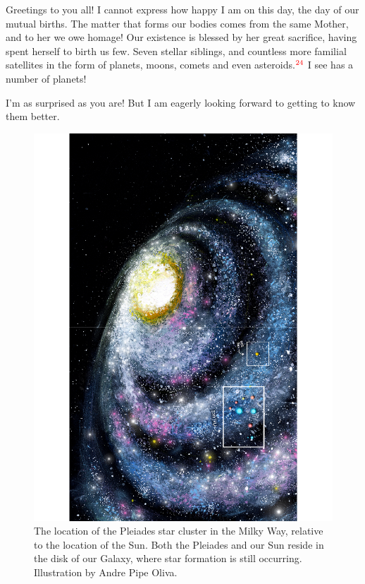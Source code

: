\documentclass[main.tex]{subfiles}
\begin{document}

\par \Maia Greetings to you all!  I cannot express how happy I am on this day, the day of our mutual births.  The matter that forms our bodies comes from the same Mother, and to her we owe homage!  Our existence is blessed by her great sacrifice, having spent herself to birth us few.  Seven stellar siblings, and countless more familial satellites in the form of planets, moons, comets and even asteroids.$^{\textcolor{red}{24}}$  I see \rmelectra has a number of planets!

\par \Electra I'm as surprised as you are!  But I am eagerly looking forward to getting to know them better.

\begin{figure}
\includegraphics[width=\columnwidth,angle=270,origin=c]{ch1_5.pdf}
\caption{The location of the Pleiades star cluster in the Milky Way, relative to the location of the Sun.  Both the Pleiades and our Sun reside in the disk of our Galaxy, where star formation is still occurring.  Illustration by Andre Pipe Oliva.
\label{fig:fig5}}
\end{figure}
\end{document}
